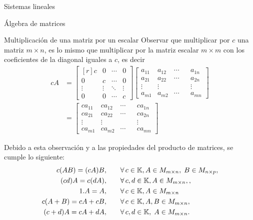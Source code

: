 \begin{chapter}{Sistemas lineales}
\begin{section}{\'Algebra de matrices}
\begin{subsection}{Multiplicaci\'on de una matriz por un escalar}
        Observar que multiplicar por $c$ una matriz $m \times n$,  es lo mismo que multiplicar por la matriz escalar $m \times m$ con los coeficientes de la diagonal iguales a $c$,  es decir
        \begin{align*}
            cA &= \begin{bmatrix*}[r]
            c     &     0& \cdots & 0\\
            0     &     c& \cdots & 0\\
            \vdots&\vdots&  \ddots      &\vdots\\
            0     &    0  & \cdots & c
            \end{bmatrix*}
             \begin{bmatrix}
            a_{11}&a_{12}& \cdots & & a_{1n}\\
            a_{21}&a_{22}& \cdots & &a_{2n}\\
            \vdots&\vdots&  & &\vdots\\
            a_{m1}&a_{m2}& \cdots & & a_{mn}
            \end{bmatrix}  \\
            &=
             \begin{bmatrix}
            ca_{11}&ca_{12}& \cdots & & ca_{1n}\\
            ca_{21}&ca_{22}& \cdots & &ca_{2n}\\
            \vdots&\vdots&  & &\vdots\\
            ca_{m1}&ca_{m2}& \cdots & & ca_{mn}
            \end{bmatrix}
        \end{align*}
        
        Debido a esta observación y a las propiedades del producto de matrices, se cumple lo siguiente:
            \begin{align*}
             c(A B) = (cA) B,\qquad &\forall\, c \in \mathbb K,  A \in M_{m \times n}, \;B \in M_{n \times p}, \\
             (cd)A = c(dA),  \qquad &\forall\, c,d \in \mathbb K,  A \in M_{m \times n},, \\
            1.A = A ,\qquad&\forall\, c \in \mathbb K, A \in M_{m \times n}\\
            c(A + B) = cA + cB,\qquad& \forall\, c \in \mathbb K, A,B \in M_{m \times n}, \\
            (c+ d)A = cA + dA,\qquad& \forall\, c,d \in \mathbb K, \; A \in M_{m \times n}.
            \end{align*}
            

\end{subsection}
\end{section}
\end{chapter}
